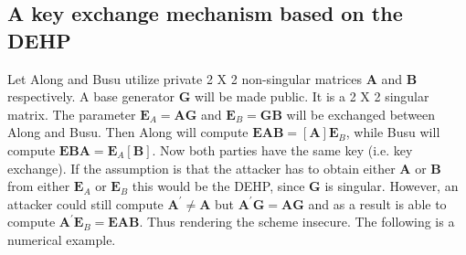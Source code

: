 \documentclass{llncs}
\begin{document}
\subsection{A key exchange mechanism based on the DEHP}
Let Along and Busu utilize private 2 X 2 non-singular matrices
$\textbf{A}$ and $\textbf{B}$ respectively. A base generator
$\textbf{G}$ will be made public. It is a 2 X 2 singular matrix.
The parameter $\textbf{E}_{A}=\textbf{AG}$ and
$\textbf{E}_{B}=\textbf{GB}$ will be exchanged between Along and
Busu. Then Along will compute
$\textbf{EAB}=[\textbf{A}]\textbf{E}_{B}$, while Busu will compute
$\textbf{EBA}=\textbf{E}_{A}[\textbf{B}]$. Now both parties have
the same key (i.e. key exchange). If the assumption is that the
attacker has to obtain either $\textbf{A}$ or $\textbf{B}$ from
either $\textbf{E}_{A}$ or $\textbf{E}_{B}$ this would be the
DEHP, since $\textbf{G}$ is singular. However, an attacker could
still compute $\textbf{A}^{'} \neq \textbf{A}$ but
$\textbf{A}^{'}\textbf{G}=\textbf{AG}$ and as a result is able to
compute $\textbf{A}^{'}\textbf{E}_{B}=\textbf{EAB}$. Thus
rendering the scheme insecure. The following is a numerical
example.
\end{document}
